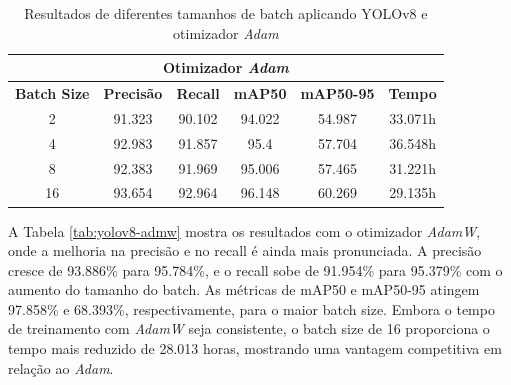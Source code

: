\begin{table}[!hbt]
    \centering
    \begin{tabular}{|c|c|c|c|c|c|}
    \hline
    \multicolumn{6}{|c|}{\textbf{Otimizador \textit{Adam}}} \\ \hline
    \textbf{Batch Size} & \textbf{Precisão} & \textbf{Recall} & \textbf{mAP50} & \textbf{mAP50-95} & \textbf{Tempo} \\ \hline
    2                   & 91.323                       & 90.102                     & 94.022                     & 54.987                        & 33.071h                         \\ \hline
    4                   & 92.983                       & 91.857                     & 95.4                       & 57.704                        & 36.548h                         \\ \hline
    8                   & 92.383                       & 91.969                     & 95.006                     & 57.465                        & 31.221h                         \\ \hline
    16                  & 93.654                       & 92.964                     & 96.148                     & 60.269                        & 29.135h                         \\ \hline
    \end{tabular}
    \caption{Resultados de diferentes tamanhos de batch aplicando YOLOv8 e otimizador \textit{Adam}}
    \label{tab:yolov8-adm}
\end{table}

A Tabela \ref{tab:yolov8-admw} mostra os resultados com o otimizador \textit{AdamW}, onde a melhoria na precisão e no recall é ainda mais pronunciada. A precisão cresce de 93.886\% para 95.784\%, e o recall sobe de 91.954\% para 95.379\% com o aumento do tamanho do batch. As métricas de mAP50 e mAP50-95 atingem 97.858\% e 68.393\%, respectivamente, para o maior batch size. Embora o tempo de treinamento com \textit{AdamW} seja consistente, o batch size de 16 proporciona o tempo mais reduzido de 28.013 horas, mostrando uma vantagem competitiva em relação ao \textit{Adam}.

